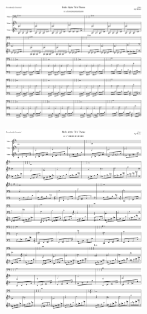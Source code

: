 \begin{figure}[H]                                             
{                                                             
  \setlength{\tabcolsep}{3.0pt}                               
  \setlength\cmidrulewidth{\heavyrulewidth} %
    \begin{subfigure}{0.5\textwidth}                            
  \includegraphics[width=6cm]{music/title_no_61_page_1001.png}%
    \end{subfigure}                                             
  \begin{subfigure}{0.5\textwidth}                            
  \includegraphics[width=6cm]{music/title_no_62_page_1001.png}%
    \end{subfigure}                                             
}                                                             
\end{figure}                                                  


